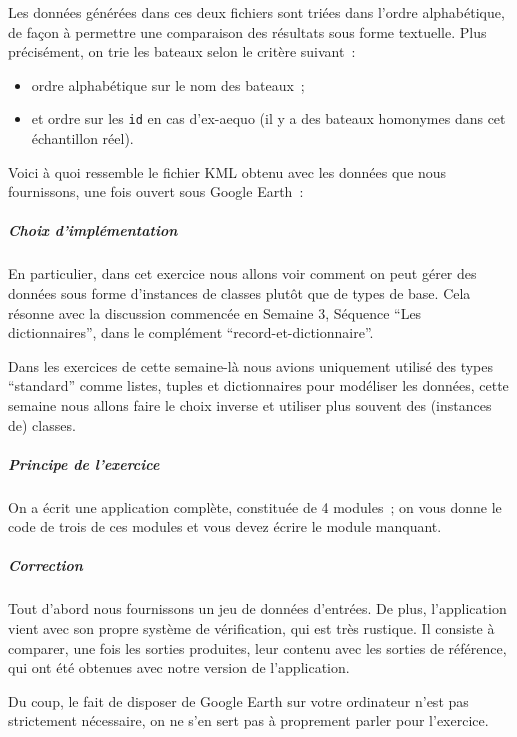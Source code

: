 Les données générées dans ces deux fichiers sont triées dans l'ordre
alphabétique, de façon à permettre une comparaison des résultats sous
forme textuelle. Plus précisément, on trie les bateaux selon le critère
suivant~:

\begin{itemize}
\tightlist
\item
  ordre alphabétique sur le nom des bateaux~;
\item
  et ordre sur les \texttt{id} en cas d'ex-aequo (il y a des bateaux
  homonymes dans cet échantillon réel).
\end{itemize}

    Voici à quoi ressemble le fichier KML obtenu avec les données que nous
fournissons, une fois ouvert sous Google Earth~:

    \hypertarget{choix-dimpluxe9mentation}{%
\subparagraph{Choix d'implémentation}\label{choix-dimpluxe9mentation}}

    En particulier, dans cet exercice nous allons voir comment on peut gérer
des données sous forme d'instances de classes plutôt que de types de
base. Cela résonne avec la discussion commencée en Semaine 3, Séquence
``Les dictionnaires'', dans le complément ``record-et-dictionnaire''.

Dans les exercices de cette semaine-là nous avions uniquement utilisé
des types ``standard'' comme listes, tuples et dictionnaires pour
modéliser les données, cette semaine nous allons faire le choix inverse
et utiliser plus souvent des (instances de) classes.

    \hypertarget{principe-de-lexercice}{%
\subparagraph{Principe de l'exercice}\label{principe-de-lexercice}}

    On a écrit une application complète, constituée de 4 modules~; on vous
donne le code de trois de ces modules et vous devez écrire le module
manquant.

    \hypertarget{correction}{%
\subparagraph{Correction}\label{correction}}

    Tout d'abord nous fournissons un jeu de données d'entrées. De plus,
l'application vient avec son propre système de vérification, qui est
très rustique. Il consiste à comparer, une fois les sorties produites,
leur contenu avec les sorties de référence, qui ont été obtenues avec
notre version de l'application.

Du coup, le fait de disposer de Google Earth sur votre ordinateur n'est
pas strictement nécessaire, on ne s'en sert pas à proprement parler pour
l'exercice.

